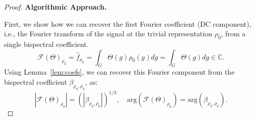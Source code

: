 \begin{proof}

\textbf{Algorithmic Approach.}

    First, we show how we can recover the first Fourier coefficient (DC component), i.e., the Fourier transform of the signal at the trivial representation $\rho_0$, from a single bispectral coefficient.
    \begin{equation}
    \mathcal{F}(\Theta)_{\rho_0} = \hat{f}_{\rho_0} = \int_G \Theta(g)\rho_0(g) dg = \int_G \Theta(g) dg \in \mathbb{C}.
     \end{equation}
    Using Lemma~\ref{lem:coefs}, we can recover this Fourier component from the bispectral coefficient $\beta_{\rho_0, \rho_0}$, as:
    \begin{equation}
        | \mathcal{F}(\Theta)_{\rho_0}| = \left(|\beta_{\rho_0, \rho_0}|\right)^{1/3},
        \quad
        \text{arg}(\mathcal{F}(\Theta)_{\rho_0}) = \text{arg}(\beta_{\rho_0, \rho_0}).
    \end{equation}


\end{proof}

